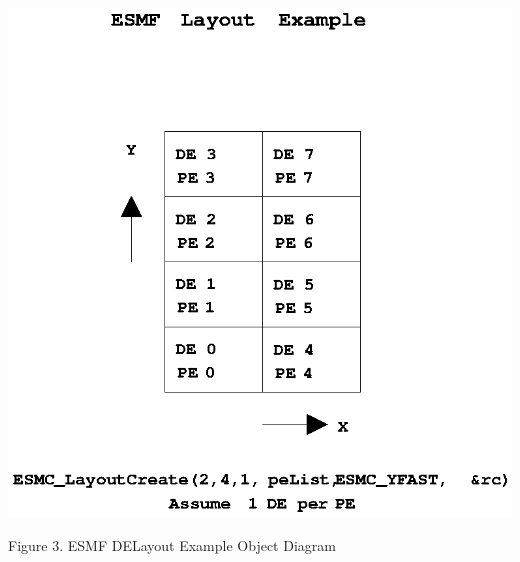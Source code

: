 \begin{center}
\includegraphics{DELayout.EPS}

Figure 3.  ESMF DELayout Example Object Diagram

\end{center}
